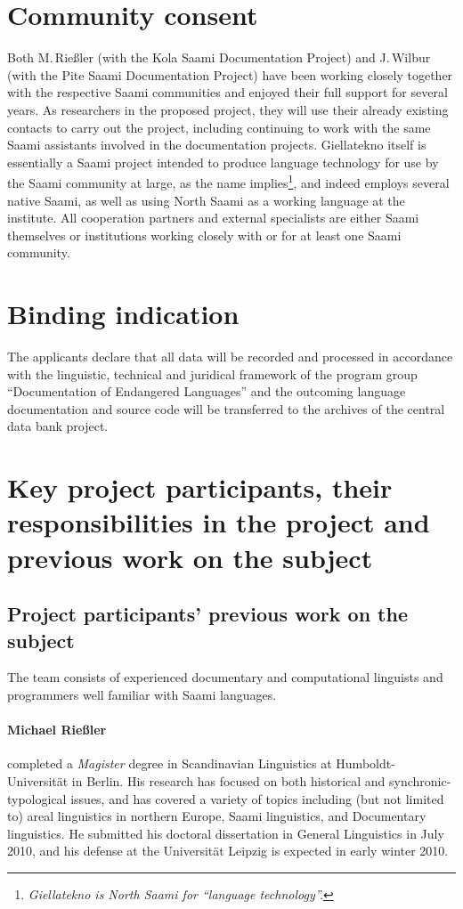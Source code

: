 \documentclass[a4paper,12pt]{article}
\begin{document}
{{\section{Community consent}
Both M.\,Rießler (with the Kola Saami Documentation Project) and J.\,Wilbur (with the Pite Saami Documentation Project) have been working closely together with the respective Saami communities and enjoyed their full support for several years. As researchers in the proposed project, they will use their already existing contacts to carry out the project, including continuing to work with the same Saami assistants involved in the documentation projects. Giellatekno itself is essentially a Saami project intended to produce language technology for use by the Saami community at large, as the name implies\footnote{{\it Giellatekno is North Saami for “language technology”.}}, and indeed employs several native Saami, as well as using North Saami as a working language at the institute. All cooperation partners and external specialists are either Saami themselves or institutions working closely with or for at least one Saami community.

\section{Binding indication}

The applicants declare that all data will be recorded and processed in accordance with the linguistic, technical and juridical framework of the program group “Documentation of Endangered Languages” and the outcoming language documentation and source code will be transferred to the archives of the central data bank project.

\section{Key project participants, their responsibilities in the project and previous work on the subject}

\subsection{Project participants' previous work on the subject}
The team consists of experienced documentary and computational linguists and programmers well familiar with Saami languages.

\paragraph{Michael Rießler} completed a \textit{Magister} degree in Scandinavian Linguistics at Humboldt-Universität in Berlin. His research has focused on both historical and synchronic-typological issues, and has covered a variety of topics including (but not limited to) areal linguistics in northern Europe, Saami linguistics, and Documentary linguistics. He submitted his doctoral dissertation in General Linguistics in July 2010, and his defense at the Universität Leipzig is expected in early winter 2010.

}}
\end{document}
